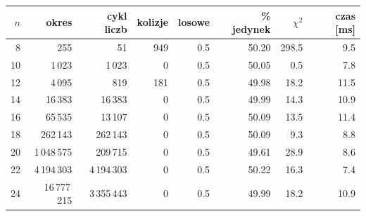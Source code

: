 \begin{tabular}{rrrrrrrr}\toprule
$n$ & okres & cykl liczb & kolizje & losowe & \% jedynek & $\chi^2$ & czas [ms] \\ \midrule
8 & 255 & 51 & 949 & 0.5 & 50.20 & 298.5 & 9.5 \\
10 & 1\,023 & 1\,023 & 0 & 0.5 & 50.05 & 0.5 & 7.8 \\
12 & 4\,095 & 819 & 181 & 0.5 & 49.98 & 18.2 & 11.5 \\
14 & 16\,383 & 16\,383 & 0 & 0.5 & 49.99 & 14.3 & 10.9 \\
16 & 65\,535 & 13\,107 & 0 & 0.5 & 50.09 & 13.5 & 11.4 \\
18 & 262\,143 & 262\,143 & 0 & 0.5 & 50.09 & 9.3 & 8.8 \\
20 & 1\,048\,575 & 209\,715 & 0 & 0.5 & 49.61 & 28.9 & 8.6 \\
22 & 4\,194\,303 & 4\,194\,303 & 0 & 0.5 & 50.22 & 16.3 & 7.4 \\
24 & 16\,777\,215 & 3\,355\,443 & 0 & 0.5 & 49.99 & 18.2 & 10.9 \\
\bottomrule\end{tabular}
